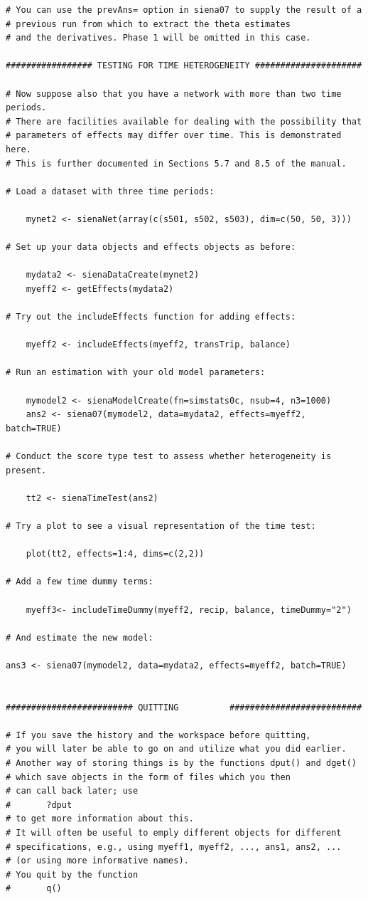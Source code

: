 \documentclass[a4paper,fleqn]{article}
\newcommand{\+}{\, + \,}
\begin{document}
{\begin{verbatim}
# You can use the prevAns= option in siena07 to supply the result of a
# previous run from which to extract the theta estimates
# and the derivatives. Phase 1 will be omitted in this case.

################# TESTING FOR TIME HETEROGENEITY #####################

# Now suppose also that you have a network with more than two time periods.
# There are facilities available for dealing with the possibility that
# parameters of effects may differ over time. This is demonstrated here.
# This is further documented in Sections 5.7 and 8.5 of the manual.

# Load a dataset with three time periods:

    mynet2 <- sienaNet(array(c(s501, s502, s503), dim=c(50, 50, 3)))

# Set up your data objects and effects objects as before:

    mydata2 <- sienaDataCreate(mynet2)
    myeff2 <- getEffects(mydata2)

# Try out the includeEffects function for adding effects:

    myeff2 <- includeEffects(myeff2, transTrip, balance)

# Run an estimation with your old model parameters:

    mymodel2 <- sienaModelCreate(fn=simstats0c, nsub=4, n3=1000)
    ans2 <- siena07(mymodel2, data=mydata2, effects=myeff2, batch=TRUE)

# Conduct the score type test to assess whether heterogeneity is present.

    tt2 <- sienaTimeTest(ans2)

# Try a plot to see a visual representation of the time test:

    plot(tt2, effects=1:4, dims=c(2,2))

# Add a few time dummy terms:

    myeff3<- includeTimeDummy(myeff2, recip, balance, timeDummy="2")

# And estimate the new model:

ans3 <- siena07(mymodel2, data=mydata2, effects=myeff2, batch=TRUE)


######################### QUITTING          ##########################

# If you save the history and the workspace before quitting,
# you will later be able to go on and utilize what you did earlier.
# Another way of storing things is by the functions dput() and dget()
# which save objects in the form of files which you then
# can call back later; use
#       ?dput
# to get more information about this.
# It will often be useful to emply different objects for different
# specifications, e.g., using myeff1, myeff2, ..., ans1, ans2, ...
# (or using more informative names).
# You quit by the function
#       q()


\end{verbatim}}
\end{document}

